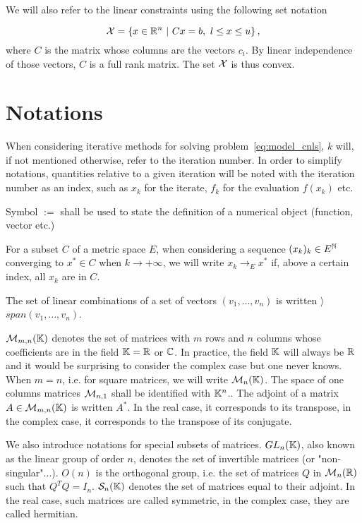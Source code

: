 \documentclass[10pt]{article}
\numberwithin{equation}{section}
\begin{document}
	We will also refer to the linear constraints using the following set notation 
	
	\begin{equation}
		\label{eq:linear_constraints}
		{\mathcal{X}} = \left\{ x \in {\mathbb{R}}^n \ | \ Cx=b,\ l \le x \le u\right\},
	\end{equation}
	where $C$ is the matrix whose columns are the vectors $c_i$. By linear independence of those vectors, $C$ is a full rank matrix. The set ${\mathcal{X}}$ is thus convex.
	
	\section*{Notations}
	 
	
	When considering iterative methods for solving problem~\eqref{eq:model_cnls}, $k$ will, if not mentioned otherwise, refer to the iteration number. In order to simplify notations, quantities relative to a given iteration will be noted with the iteration number as an index, such as $x_k$ for the iterate, $f_k$ for the evaluation $f(x_k)$ etc.
	
	Symbol $:=$ shall be used to state the definition of a numerical object (function, vector etc.)
	
	For a subset $C$ of a metric space $E$, when considering a sequence $(x_k)_k \in E^{{\mathbb{N}}}$ converging to $x^* \in C$ when $k\to+\infty$, we will write $x_k \to_E x^*$ if, above a certain index, all $x_k$ are in $C$. 
	
	The set of linear combinations of a set of vectors $(v_1,\ldots,v_n)$ is written $\rangle$ $span(v_1,\ldots,v_n)$. 
	
	${\mathcal{M}}_{m,n}({\mathbb{K}})$ denotes the set of matrices with $m$ rows and $n$ columns whose coefficients are in the field ${\mathbb{K}} = {\mathbb{R}}$ or ${\mathbb{C}}$. In practice, the field ${\mathbb{K}}$ will always be ${\mathbb{R}}$ and it would be surprising to consider the complex case but one never knows. When $m=n$, i.e. for square matrices, we will write ${\mathcal{M}}_n({\mathbb{K}})$. The space of one columns matrices ${\mathcal{M}}_{n,1}$ shall be identified with ${\mathbb{K}}^n$.. The adjoint of a matrix $A\in {\mathcal{M}}_{m,n}({\mathbb{K}})$ is written $A^*$. In the real case, it corresponds to its transpose, in the complex case, it corresponds to the transpose of its conjugate. 
	
	We also introduce notations for special subsets of matrices. $GL_n({\mathbb{K}})$, also known as the linear group of order $n$, denotes the set of invertible matrices (or "non-singular"...). $O(n)$ is the orthogonal group, i.e. the set of matrices $Q$ in ${\mathcal{M}}_n({\mathbb{R}})$ such that $Q^TQ=I_n$. ${\mathcal{S}}_n({\mathbb{K}})$ denotes the set of matrices equal to their adjoint. In the real case, such matrices are called symmetric, in the complex case, they are called hermitian.  
	
\end{document}

